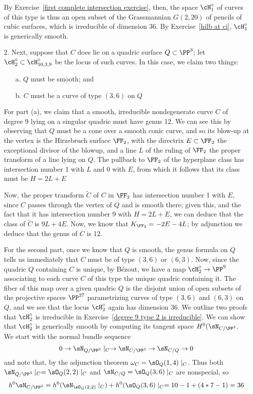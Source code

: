 By Exercise~\ref{first complete intersection exercise}, then, the space $\cH^\circ_1$ of curves of this type is thus an open subset of the Grassmannian $G(2,20)$ of pencils of cubic surfaces, which is irreducible of dimension 36. By Exercise~\ref{hilb at ci}, $\cH^\circ_1$ is generically smooth.

2. Next, suppose that $C$ does lie on a quadric surface $Q \subset \PP^3$; let $\cH^\circ_2 \subset \cH^\circ_{10,3,9}$ be the locus of such curves. In this case, we claim two things:
\begin{enumerate}
\item[a.] $Q$ must be smooth; and
\item[b.] $C$ must be a curve of type $(3,6)$ on $Q$
\end{enumerate}

For part (a), we claim that a smooth, irreducible nondegenerate curve $C$ of degree 9 lying on a singular quadric must have genus 12. We can see this by observing that $Q$ must be a cone over a smooth conic curve, and so its blow-up at the vertex is the Hirzebruch surface $\FF_2$, with the directrix $E \subset \FF_2$ the exceptional divisor of the blowup, and a line $L$ of the ruling of $\FF_2$ the proper transform of a line lying on $Q$. The pullback to $\FF_2$ of the hyperplane class has intersection number 1 with $L$ and 0 with $E$, from which it follows that its class must  be $H = 2L + E$

Now, the proper transform $\widetilde C$ of $C$ in $\FF_2$ has intersection number 1 with $E$, since $C$ passes through the vertex of $Q$ and is smooth there; given this, and the fact that it has intersection number 9 with $H = 2L+E$, we can deduce that the class of $\widetilde C$ is $9L + 4E$. Now, we know that $K_{\FF_2} = -2E - 4L$; by adjunction we deduce that  the genus of $C$ is 12.

For the second part, once we know that $Q$ is smooth, the genus formula on $Q$ tells us immediately that $C$ must be of type $(3,6)$ or $(6,3)$. Now, since the quadric $Q$ containing $C$ is unique, by B\'ezout, we have a map $\cH^\circ_2 \to \PP^9$ associating to each curve $C$ of this type the unique quadric containing it. The fiber of this map over a given quadric $Q$ is the disjoint union of open subsets of the projective spaces $\PP^{27}$ parametrizing curves of type $(3,6)$ and $(6,3)$ on $Q$, and we see that the locus $\cH^\circ_2$ again has dimension 36. We outline two proofs that 
$\cH^\circ_2$ is irreducible in Exercise~\ref{degree 9 type 2 is irreducible}.
We can show that $\cH^\circ_2$ is generically smooth by computing its tangent space
$H^0(\sN_{C/\PP^3}$. We start with the normal bundle sequence
$$
0\to \sN_{Q/\PP^3}\mid_C \to \sN_{C/\PP^3} \to \sN_{C/Q} \to 0
$$
and note that, by the adjunction theorem $\omega_C = \sO_Q(1,4)\mid_C$.
Thus both $\sN_{Q/\PP^3}\mid_C = \sO_Q(2,2)\mid_C$ and
$\sN_{C/Q} = \sO_Q(3,6)\mid_C$ are nonspecial, so 
$$
h^0 \sN_{C/\PP^3} = h^0(\sN_{\sO_Q(2,2)}\mid_C ) + h^0(\sO_Q(3,6)\mid_C
= 10-1 + (4*7-1) = 36
$$

